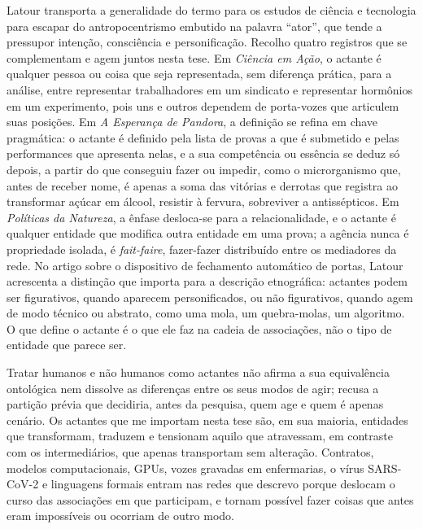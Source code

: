 Latour transporta a generalidade do termo para os estudos de ciência e tecnologia para escapar do antropocentrismo embutido na palavra \enquote{ator}, que tende a pressupor intenção, consciência e personificação. Recolho quatro registros que se complementam e agem juntos nesta tese. Em \textit{Ciência em Ação}, o actante é qualquer pessoa ou coisa que seja representada, sem diferença prática, para a análise, entre representar trabalhadores em um sindicato e representar hormônios em um experimento, pois uns e outros dependem de porta-vozes que articulem suas posições. Em \textit{A Esperança de Pandora}, a definição se refina em chave pragmática: o actante é definido pela lista de provas a que é submetido e pelas performances que apresenta nelas, e a sua competência ou essência se deduz só depois, a partir do que conseguiu fazer ou impedir, como o microrganismo que, antes de receber nome, é apenas a soma das vitórias e derrotas que registra ao transformar açúcar em álcool, resistir à fervura, sobreviver a antissépticos. Em \textit{Políticas da Natureza}, a ênfase desloca-se para a relacionalidade, e o actante é qualquer entidade que modifica outra entidade em uma prova; a agência nunca é propriedade isolada, é \textit{fait-faire}, fazer-fazer distribuído entre os mediadores da rede. No artigo sobre o dispositivo de fechamento automático de portas, Latour acrescenta a distinção que importa para a descrição etnográfica: actantes podem ser figurativos, quando aparecem personificados, ou não figurativos, quando agem de modo técnico ou abstrato, como uma mola, um quebra-molas, um algoritmo. O que define o actante é o que ele faz na cadeia de associações, não o tipo de entidade que parece ser.

Tratar humanos e não humanos como actantes não afirma a sua equivalência ontológica nem dissolve as diferenças entre os seus modos de agir; recusa a partição prévia que decidiria, antes da pesquisa, quem age e quem é apenas cenário. Os actantes que me importam nesta tese são, em sua maioria, entidades que transformam, traduzem e tensionam aquilo que atravessam, em contraste com os intermediários, que apenas transportam sem alteração. Contratos, modelos computacionais, GPUs, vozes gravadas em enfermarias, o vírus SARS-CoV-2 e linguagens formais entram nas redes que descrevo porque deslocam o curso das associações em que participam, e tornam possível fazer coisas que antes eram impossíveis ou ocorriam de outro modo.

